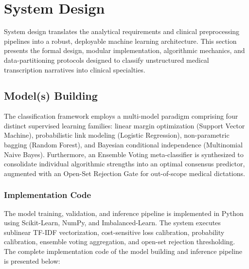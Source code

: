 \clearpage

\section{System Design}

System design translates the analytical requirements and clinical preprocessing pipelines into a robust, deployable machine learning architecture. This section presents the formal design, modular implementation, algorithmic mechanics, and data-partitioning protocols designed to classify unstructured medical transcription narratives into clinical specialties.

\subsection{Model(s) Building}

The classification framework employs a multi-model paradigm comprising four distinct supervised learning families: linear margin optimization (Support Vector Machine), probabilistic link modeling (Logistic Regression), non-parametric bagging (Random Forest), and Bayesian conditional independence (Multinomial Naive Bayes). Furthermore, an Ensemble Voting meta-classifier is synthesized to consolidate individual algorithmic strengths into an optimal consensus predictor, augmented with an Open-Set Rejection Gate for out-of-scope medical dictations.

\subsubsection{Implementation Code}

The model training, validation, and inference pipeline is implemented in Python using Scikit-Learn, NumPy, and Imbalanced-Learn. The system executes sublinear TF-IDF vectorization, cost-sensitive loss calibration, probability calibration, ensemble voting aggregation, and open-set rejection thresholding. The complete implementation code of the model building and inference pipeline is presented below:

